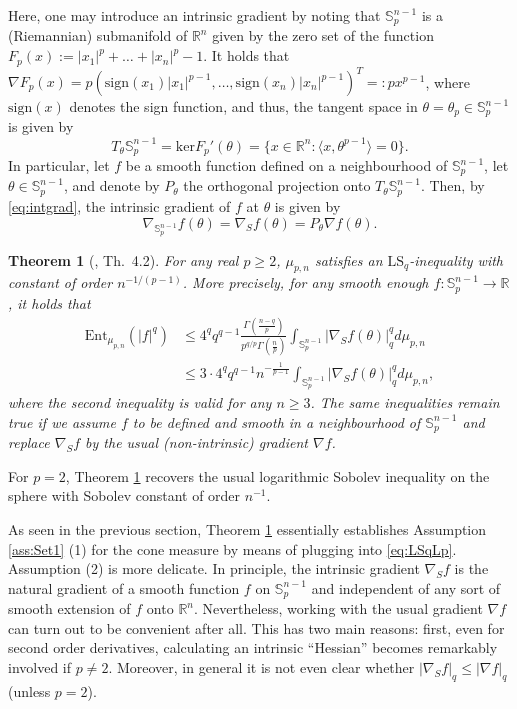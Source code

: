 \documentclass[a4paper,12pt]{amsart}
\numberwithin{equation}{section}
\newtheorem{satz}{Theorem}[section]
\theoremstyle{remark}
\def\R{{\mathbb R}}
\def\S{{\mathbb S}}
\def\sign{{\mathrm{sign}}}
\begin{document}
Here, one may introduce an intrinsic gradient by noting that $\S_p^{n-1}$ is a (Riemannian) submanifold of $\R^n$ given by the zero set of the function $F_p(x) := |x_1|^p + \ldots + |x_n|^p - 1$. It holds that $\nabla F_p(x) = p(\sign(x_1)|x_1|^{p-1}, \ldots, \sign(x_n)|x_n|^{p-1})^T =: px^{p-1}$, where $\mathrm{sign}(x)$ denotes the sign function, and thus, the tangent space in $\theta = \theta_p \in \S_p^{n-1}$ is given by
\[
T_\theta\S_p^{n-1} = \mathrm{ker} F_p'(\theta) = \{ x \in \R^n \colon \langle x, \theta^{p-1} \rangle = 0\}.
\]
In particular, let $f$ be a smooth function defined on a neighbourhood of $\S_p^{n-1}$, let $\theta \in \S_p^{n-1}$, and denote by $P_\theta$ the orthogonal projection onto $T_\theta\S_p^{n-1}$. Then, by \eqref{eq:intgrad}, the intrinsic gradient of $f$ at $\theta$ is given by
\[
\nabla_{\S_p^{n-1}} f(\theta) = \nabla_S f(\theta) = P_\theta \nabla f(\theta).
\]

\begin{satz}[\cite{GS24}, Th.\ 4.2]\label{thm:LSICone}
	For any real $p \ge 2$, $\mu_{p,n}$ satisfies an $\mathrm{LS}_q$-inequality with constant of order $n^{-1/(p-1)}$. More precisely, for any smooth enough $f \colon \S_p^{n-1} \to \R$, it holds that
	\begin{align*}
		\mathrm{Ent}_{\mu_{p,n}}(|f|^q) &\le 4^q q^{q-1} \frac {\Gamma(\frac{n-q}{p})}{p^{q/p}\Gamma(\frac n p)} \int_{\S_p^{n-1}} \lvert \nabla_{S} f(\theta) \rvert_q^q d \mu_{p,n}\\
		&\le 3 \cdot 4^q q^{q-1} n^{-\frac{1}{p-1}} \int_{\S_p^{n-1}} \lvert \nabla_S f(\theta) \rvert_q^q d \mu_{p,n},
	\end{align*}
	where the second inequality is valid for any $n \ge 3$. The same inequalities remain true if we assume $f$ to be defined and smooth in a neighbourhood of $\S_p^{n-1}$ and replace $\nabla_S f$ by the usual (non-intrinsic) gradient $\nabla f$.
\end{satz}

For $p=2$, Theorem \ref{thm:LSICone} recovers the usual logarithmic Sobolev inequality on the sphere with Sobolev constant of order $n^{-1}$.

As seen in the previous section, Theorem \ref{thm:LSICone} essentially establishes Assumption \ref{ass:Set1} (1) for the cone measure by means of plugging into \eqref{eq:LSqLp}. Assumption (2) is more delicate. In principle, the intrinsic gradient $\nabla_S f$ is the natural gradient of a smooth function $f$ on $\S_p^{n-1}$ and independent of any sort of smooth extension of $f$ onto $\R^n$. Nevertheless, working with the usual gradient $\nabla f$ can turn out to be convenient after all. This has two main reasons: first, even for second order derivatives, calculating an intrinsic ``Hessian'' becomes remarkably involved if $p \ne 2$. Moreover, in general it is not even clear whether $|\nabla_S f|_q \le |\nabla f|_q$ (unless $p =2$).
\end{document}
